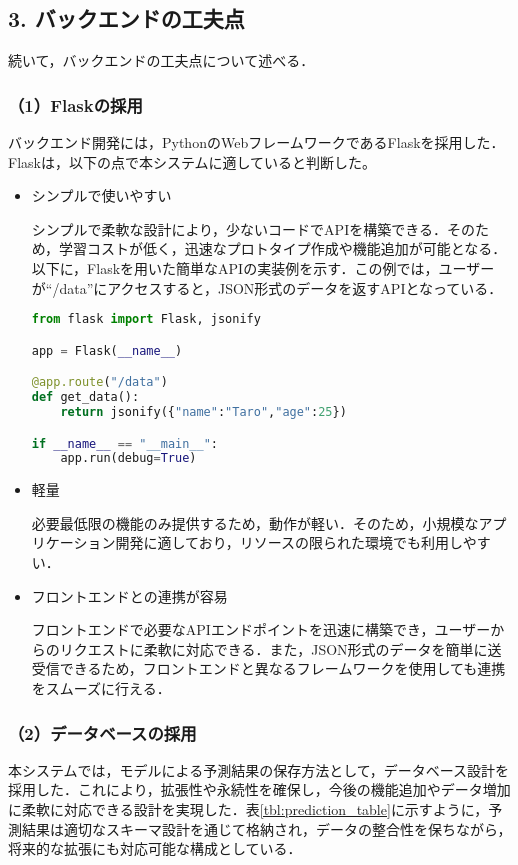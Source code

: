 \subsection*{3. バックエンドの工夫点}

続いて，バックエンドの工夫点について述べる．

\subsubsection*{（1）Flaskの採用}
バックエンド開発には，PythonのWebフレームワークであるFlaskを採用した．Flaskは，以下の点で本システムに適していると判断した。

\begin{itemize}
	\item シンプルで使いやすい
	
	シンプルで柔軟な設計により，少ないコードでAPIを構築できる．そのため，学習コストが低く，迅速なプロトタイプ作成や機能追加が可能となる．以下に，Flaskを用いた簡単なAPIの実装例を示す．この例では，ユーザーが``/data''にアクセスすると，JSON形式のデータを返すAPIとなっている．
\begin{lstlisting}[style=mystyle, language=Python, caption=Flaskによる簡単なAPIの実装例]
from flask import Flask, jsonify

app = Flask(__name__)

@app.route("/data")
def get_data():
	return jsonify({"name":"Taro","age":25})

if __name__ == "__main__":
	app.run(debug=True)
\end{lstlisting}
	
	\item 軽量
	
	必要最低限の機能のみ提供するため，動作が軽い．そのため，小規模なアプリケーション開発に適しており，リソースの限られた環境でも利用しやすい．

	\item フロントエンドとの連携が容易
	 
	フロントエンドで必要なAPIエンドポイントを迅速に構築でき，ユーザーからのリクエストに柔軟に対応できる．また，JSON形式のデータを簡単に送受信できるため，フロントエンドと異なるフレームワークを使用しても連携をスムーズに行える．
\end{itemize}

\subsubsection*{（2）データベースの採用}
本システムでは，モデルによる予測結果の保存方法として，データベース設計を採用した．これにより，拡張性や永続性を確保し，今後の機能追加やデータ増加に柔軟に対応できる設計を実現した．表\ref{tbl:prediction_table}に示すように，予測結果は適切なスキーマ設計を通じて格納され，データの整合性を保ちながら，将来的な拡張にも対応可能な構成としている．


